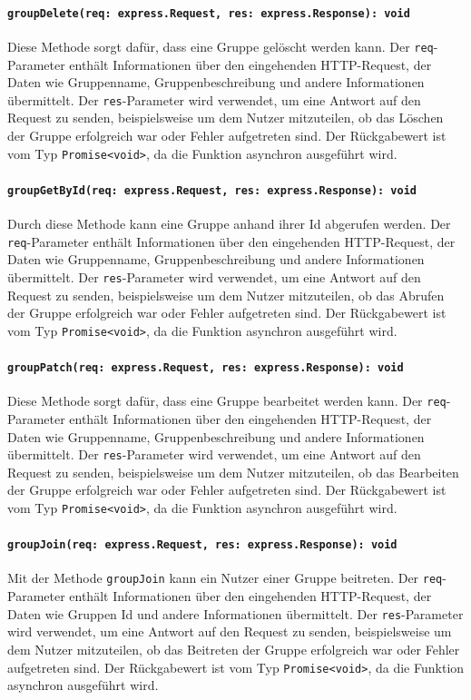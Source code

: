 \documentclass{entwurfsheft}
\begin{document}
\paragraph{\texttt{groupDelete(req: express.Request, res: express.Response): void}}
Diese Methode sorgt dafür, dass eine Gruppe gelöscht werden kann. Der \texttt{req}-Parameter enthält Informationen über den eingehenden HTTP-Request, der Daten wie Gruppenname, Gruppenbeschreibung und andere Informationen übermittelt. Der \texttt{res}-Parameter wird verwendet, um eine Antwort auf den Request zu senden, beispielsweise um dem Nutzer mitzuteilen, ob das Löschen der Gruppe erfolgreich war oder Fehler aufgetreten sind.
Der Rückgabewert ist vom Typ \texttt{Promise<void>}, da die Funktion asynchron ausgeführt wird.
\paragraph{\texttt{groupGetById(req: express.Request, res: express.Response): void}}
Durch diese Methode kann eine Gruppe anhand ihrer Id abgerufen werden. Der \texttt{req}-Parameter enthält Informationen über den eingehenden HTTP-Request, der Daten wie Gruppenname, Gruppenbeschreibung und andere Informationen übermittelt. Der \texttt{res}-Parameter wird verwendet, um eine Antwort auf den Request zu senden, beispielsweise um dem Nutzer mitzuteilen, ob das Abrufen der Gruppe erfolgreich war oder Fehler aufgetreten sind.
Der Rückgabewert ist vom Typ \texttt{Promise<void>}, da die Funktion asynchron ausgeführt wird.
\paragraph{\texttt{groupPatch(req: express.Request, res: express.Response): void}}
Diese Methode sorgt dafür, dass eine Gruppe bearbeitet werden kann. Der \texttt{req}-Parameter enthält Informationen über den eingehenden HTTP-Request, der Daten wie Gruppenname, Gruppenbeschreibung und andere Informationen übermittelt. Der \texttt{res}-Parameter wird verwendet, um eine Antwort auf den Request zu senden, beispielsweise um dem Nutzer mitzuteilen, ob das Bearbeiten der Gruppe erfolgreich war oder Fehler aufgetreten sind.
Der Rückgabewert ist vom Typ \texttt{Promise<void>}, da die Funktion asynchron ausgeführt wird.
\paragraph{\texttt{groupJoin(req: express.Request, res: express.Response): void}}
Mit der Methode \texttt{groupJoin} kann ein Nutzer einer Gruppe beitreten. Der \texttt{req}-Parameter enthält Informationen über den eingehenden HTTP-Request, der Daten wie Gruppen Id und andere Informationen übermittelt. Der \texttt{res}-Parameter wird verwendet, um eine Antwort auf den Request zu senden, beispielsweise um dem Nutzer mitzuteilen, ob das Beitreten der Gruppe erfolgreich war oder Fehler aufgetreten sind.
Der Rückgabewert ist vom Typ \texttt{Promise<void>}, da die Funktion asynchron ausgeführt wird.
\end{document}
